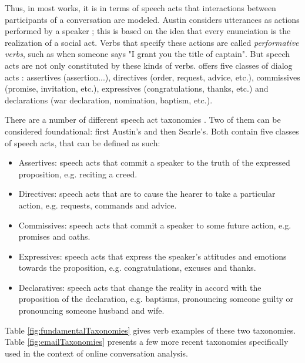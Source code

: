 \documentclass[11pt]{article}
\begin{document}
Thus, in most works, it is in terms of speech acts that interactions between participants of a conversation are modeled. Austin considers utterances as actions performed by a speaker ; this is based on the idea that every enunciation is the realization of a social act. Verbs that specify these actions are called \textit{performative verbs}, such as when someone says "I grant you the title of captain". But speech acts are not only constituted by these kinds of verbs. \cite{searle1976taxonomy} offers five classes of dialog acts : assertives (assertion...), directives (order, request, advice, etc.), commissives (promise, invitation, etc.), expressives (congratulations, thanks, etc.) and declarations (war declaration, nomination, baptism, etc.).

There are a number of different speech act taxonomies \cite{traum200020}. Two of them can be considered foundational: first Austin's and then Searle's. Both contain five classes of speech acts, that can be defined as such:


\begin{itemize}
	\item Assertives: speech acts that commit a speaker to the truth of the expressed proposition, e.g. reciting a creed.
	\item Directives: speech acts that are to cause the hearer to take a particular action, e.g. requests, commands and advice.
	\item Commissives: speech acts that commit a speaker to some future action, e.g. promises and oaths.
	\item Expressives: speech acts that express the speaker's attitudes and emotions towards the proposition, e.g. congratulations, excuses and thanks.
	\item Declaratives: speech acts that change the reality in accord with the proposition of the declaration, e.g. baptisms, pronouncing someone guilty or pronouncing someone husband and wife.
\end{itemize}

Table \ref{fig:fundamentalTaxonomies} gives verb examples of these two taxonomies.  Table \ref{fig:emailTaxonomies} presents a few more recent taxonomies specifically used in the context of online conversation analysis.
\end{document}
